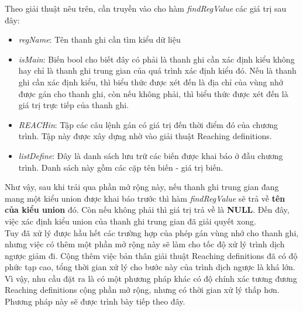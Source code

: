 Theo giải thuật nêu trên, cần truyền vào cho hàm \textit{findRegValue} các giá trị sau đây:
\begin{itemize}
	\item \textit{regName}: Tên thanh ghi cần tìm kiểu dữ liệu
	\item \textit{isMain}: Biến bool cho biết đây có phải là thanh ghi cần xác định kiểu không hay chỉ là thanh ghi trung gian của quá trình xác định kiểu đó. Nếu là thanh ghi cần xác định kiểu, thì biểu thức được xét đến là địa chỉ của vùng nhớ được gán cho thanh ghi, còn nếu không phải, thì biểu thức được xét đến là giá trị trực tiếp của thanh ghi.
	\item \textit{REACHin}: Tập các câu lệnh gán có giá trị đến thời điểm đó của chương trình. Tập này được xây dựng nhờ vào giải thuật Reaching definitions.
	\item \textit{listDefine}: Đây là danh sách lưu trữ các biến được khai báo ở đầu chương trình. Danh sách này gồm các cặp tên biến - giá trị biến.
\end{itemize}

Như vậy, sau khi trải qua phần mở rộng này, nếu thanh ghi trung gian đang mang một kiểu union được khai báo trước thì hàm \textit{findRegValue} sẽ trả về \textbf{tên của kiểu union} đó. Còn nếu không phải thì giá trị trả về là \textbf{NULL}. Đến đây, việc xác định kiểu union của thanh ghi trung gian đã giải quyết xong.\\

Tuy đã xử lý được hầu hết các trường hợp của phép gán vùng nhớ cho thanh ghi, nhưng việc có thêm một phần mở rộng này sẽ làm cho tốc độ xử lý trình dịch ngược giảm đi. Cộng thêm việc bản thân giải thuật Reaching definitions đã có độ phức tạp cao, tổng thời gian xử lý cho bước này của trình dịch ngược là khá lớn. Vì vậy, nhu cầu đặt ra là có một phương pháp khác có độ chính xác tương đương Reaching definitions cộng phần mở rộng, nhưng có thời gian xử lý thấp hơn. Phương pháp này sẽ được trình bày tiếp theo đây.

